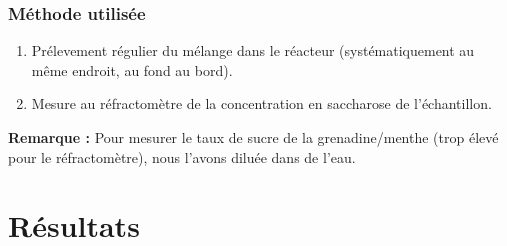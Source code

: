 \documentclass[a4paper,11pt]{article}
\begin{document}
		\subsubsection{Méthode utilisée}
			\begin{enumerate}
				\item Prélevement régulier du mélange dans le réacteur (systématiquement au même endroit, au fond au bord).
				\item Mesure au réfractomètre de la concentration en saccharose de l'échantillon.
			\end{enumerate}
			\textbf{Remarque :} Pour mesurer le taux de sucre de la grenadine/menthe (trop élevé pour le réfractomètre), nous l'avons diluée dans de l'eau.


\section{Résultats}
\end{document}
